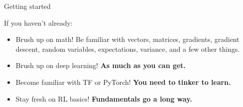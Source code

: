 \documentclass[9pt]{beamer}
\begin{document}
\begin{frame}{Getting started}

If you haven't already:
\begin{itemize}
\item Brush up on math! Be familiar with vectors, matrices, gradients, gradient descent, random variables, expectations, variance, and a few other things.
\item Brush up on deep learning! \textbf{As much as you can get.}
\item Become familiar with TF or PyTorch! \textbf{You need to tinker to learn.}
\item Stay fresh on RL basics! \textbf{Fundamentals go a long way.}
\end{itemize}

\end{frame}
\end{document}
